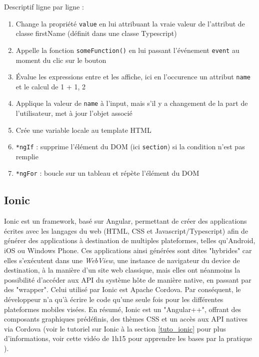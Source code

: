 \documentclass[a4paper, 12pt]{article}
\begin{document}
Descriptif ligne par ligne :
\begin{enumerate}
    \item Change la propriété \texttt{value} en lui attribuant la vraie valeur de l'attribut de classe firstName (définit dans une classe Typescript)
    \item Appelle la fonction \texttt{someFunction()} en lui passant l'événement \texttt{event} au moment du clic sur le bouton
    \item Évalue les expressions entre {} et les affiche, ici en l'occurence un attribut \texttt{name} et le calcul de 1 + 1, 2
    \item Applique la valeur de \texttt{name} à l'input, mais s'il y a changement de la part de l'utilisateur, met à jour l'objet associé
    \item Crée une variable locale au template HTML
    \item \texttt{*ngIf} : supprime l'élément du DOM (ici \texttt{section}) si la condition n'est pas remplie
    \item \texttt{*ngFor} : boucle sur un tableau et répète l'élément du DOM
\end{enumerate}

\subsection{Ionic}
Ionic est un framework, basé sur Angular, permettant de créer des applications écrites avec les langages du web (HTML, CSS et
Javascript/Typescript) afin de générer des applications à destination de multiples plateformes, telles qu'Android,
iOS ou Windows Phone. Ces applications ainsi générées sont dites "hybrides" car elles s'exécutent dans une
\textit{WebView}, une instance de navigateur du device de destination, à la manière d'un site web classique, mais
elles ont néanmoins la possibilité d'accéder aux API du système hôte de manière native, en passant par des "wrapper".
Celui utilisé par Ionic est Apache Cordova. Par conséquent, le développeur n'a qu'à écrire le code qu'une seule fois
pour les différentes plateformes mobiles visées. En résumé, Ionic est un "Angular++", offrant des composants graphiques
prédéfinis, des thèmes CSS et un accès aux API natives via Cordova
(voir le tutoriel sur Ionic à la section \ref{tuto_ionic} pour plus d'informations, voir cette vidéo de 1h15 pour
apprendre les bases par la pratique \cite{ref18}).
\end{document}
